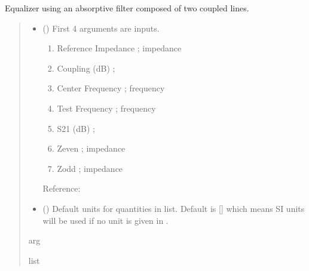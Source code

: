 \documentclass[letterpaper,10pt,english]{sphinxmanual}
\begin{document}
\begin{fulllineitems}
\label{\detokenize{components:components.Absorptive_Filter_Equalizer}}
\pysigstartsignatures
{}
\pysigstopsignatures
\sphinxAtStartPar
Equalizer using an absorptive filter composed of two coupled lines.
\begin{quote}\begin{description}
\begin{itemize}
\item {} 
\sphinxAtStartPar
{} () \textendash{} 
\sphinxAtStartPar
First 4 arguments are inputs.
\begin{enumerate}
%
\item {} 
\sphinxAtStartPar
Reference Impedance ; impedance

\item {} 
\sphinxAtStartPar
Coupling (dB) ;

\item {} 
\sphinxAtStartPar
Center Frequency ; frequency

\item {} 
\sphinxAtStartPar
Test Frequency ; frequency

\item {} 
\sphinxAtStartPar
S21 (dB) ;

\item {} 
\sphinxAtStartPar
Zeven ;  impedance

\item {} 
\sphinxAtStartPar
Zodd ;  impedance

\end{enumerate}

\sphinxAtStartPar
Reference:


\item {} 
\sphinxAtStartPar
{} (\sphinxstyleliteralemphasis{\sphinxupquote{, }}) \textendash{} Default units for quantities in  list. Default is {[}{]} which means SI units will be used if no unit is given in .

\end{itemize}

\sphinxAtStartPar
arg

\sphinxAtStartPar
list

\end{description}\end{quote}

\end{fulllineitems}
\end{document}
